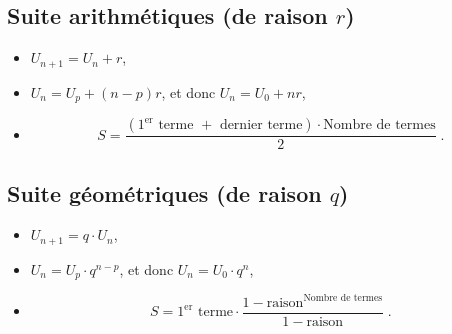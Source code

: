 \TCDLessonStyleOff
\begin{fiche}
      \subsection*{Suite arithm\'etiques (de raison $r$)}
            \begin{itemize}
                  \item $U_{n+1} = U_n + r$,
                  \item $U_n = U_p + (n-p) r$, et donc $U_n = U_0 + n r$,
                  \item \[
                              S = \frac{
                                          \left(
                                                \text{$1^\text{er}$ terme $+$ dernier terme}
                                          \right)
                                          \cdot
                                          \text{Nombre de termes}
                                       }{2}      \;.
                        \]
            \end{itemize}
      \subsection*{Suite g\'eom\'etriques (de raison $q$)}
            \begin{itemize}
                  \item $U_{n+1} = q \cdot U_n $,
                  \item $U_n = U_p \cdot q^{n-p}$, et donc $U_n = U_0 \cdot q^n$,
                  \item \[
                              S = \text{$1^{\text{er}}$ terme}
                                    \cdot
                                  \frac{
                                             1-\text{raison}^{\text{Nombre de termes}}
                                       }{
                                             1-\text{raison}
                                       }      \;.
                        \]
            \end{itemize}

\end{fiche}
